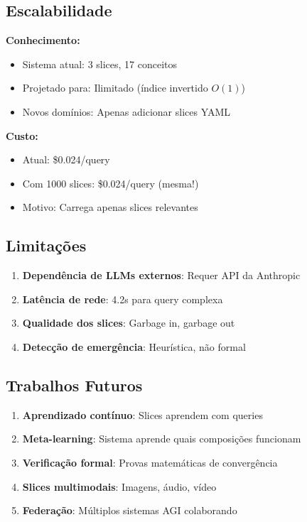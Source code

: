 \documentclass[11pt]{article}
\begin{document}
\subsection{Escalabilidade}

\textbf{Conhecimento:}
\begin{itemize}
    \item Sistema atual: 3 slices, 17 conceitos
    \item Projetado para: Ilimitado (índice invertido $O(1)$)
    \item Novos domínios: Apenas adicionar slices YAML
\end{itemize}

\textbf{Custo:}
\begin{itemize}
    \item Atual: \$0.024/query
    \item Com 1000 slices: \$0.024/query (mesma!)
    \item Motivo: Carrega apenas slices relevantes
\end{itemize}

\subsection{Limitações}

\begin{enumerate}
    \item \textbf{Dependência de LLMs externos}: Requer API da Anthropic
    \item \textbf{Latência de rede}: 4.2s para query complexa
    \item \textbf{Qualidade dos slices}: Garbage in, garbage out
    \item \textbf{Detecção de emergência}: Heurística, não formal
\end{enumerate}

\subsection{Trabalhos Futuros}

\begin{enumerate}
    \item \textbf{Aprendizado contínuo}: Slices aprendem com queries
    \item \textbf{Meta-learning}: Sistema aprende quais composições funcionam
    \item \textbf{Verificação formal}: Provas matemáticas de convergência
    \item \textbf{Slices multimodais}: Imagens, áudio, vídeo
    \item \textbf{Federação}: Múltiplos sistemas AGI colaborando
\end{enumerate}
\end{document}
